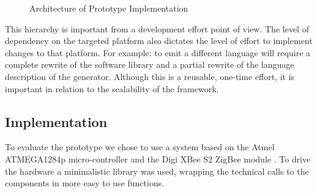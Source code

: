 \documentclass[conference]{IEEEtran}
\begin{document}
\begin{figure}[ht]
  \centering
  \caption{Architecture of Prototype Implementation}
  \label{fig:architecture}
\end{figure}

This hierarchy is important from a development effort point of view. The level
of dependency on the targeted platform also dictates the level of effort to
implement changes to that platform. For example: to emit a different language
will require a complete rewrite of the software library and a partial rewrite
of the language description of the generator. Although this is a reusable,
one-time effort, it is important in relation to the scalability of the
framework.

\subsection*{Implementation}

To evaluate the prototype we chose to use a system based on the Atmel
ATMEGA1284p micro-controller \cite{datasheet:atmega1284p} and the Digi XBee S2
ZigBee module \cite{manual:xbee}. To drive the hardware a minimalistic library
was used, wrapping the technical calls to the components in more easy to use
functions.
\end{document}
